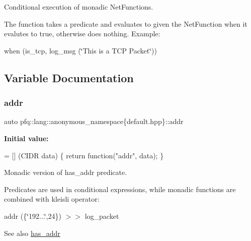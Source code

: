 Conditional execution of monadic Net\+Functions. 

The function takes a predicate and evaluates to given the Net\+Function when it evalutes to {\ttfamily true}, otherwise does nothing. Example\+:

when (is\+\_\+tcp, log\+\_\+msg (\char`\"{}\+This is a T\+C\+P Packet\char`\"{})) 

\subsection{Variable Documentation}
\mbox{\label{namespacepfq_1_1lang_1_1anonymous__namespace_02default_8hpp_03_a13cabe468839119d8d68540e3c60718b}} 
\subsubsection{\texorpdfstring{addr}{addr}}
{\footnotesize\ttfamily auto pfq\+::lang\+::anonymous\+\_\+namespace\{default.\+hpp\}\+::addr}

{\bfseries Initial value\+:}
\begin{DoxyCode}
= [] (CIDR data)
        \{
            \textcolor{keywordflow}{return} \textcolor{keyword}{function}(\textcolor{stringliteral}{"addr"}, data);
        \}
\end{DoxyCode}


Monadic version of {\ttfamily has\+\_\+addr} predicate. 

Predicates are used in conditional expressions, while monadic functions are combined with kleisli operator\+:

addr (\{\char`\"{}192...\char`\"{},24\}) $>$$>$ log\+\_\+packet

\begin{DoxySeeAlso}{See also}
\hyperlink{namespacepfq_1_1lang_1_1anonymous__namespace_02default_8hpp_03_a74c6b7e812fb3d312ebf534960a6a91d}{has\+\_\+addr} 
\end{DoxySeeAlso}
\mbox{\label{namespacepfq_1_1lang_1_1anonymous__namespace_02default_8hpp_03_abfcd230137acb93cfd99f7a0a7c1f17f}} 
